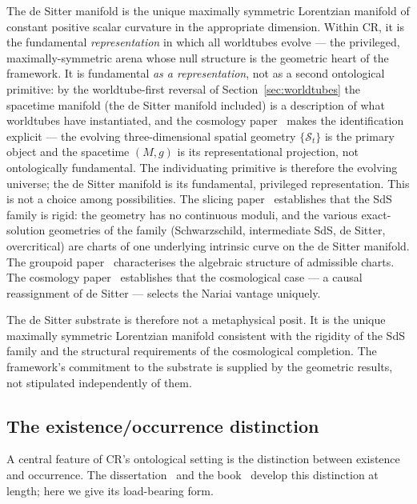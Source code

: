 \documentclass[11pt,a4paper]{article}
\theoremstyle{definition}
\begin{document}
The de Sitter manifold is the unique maximally symmetric Lorentzian manifold of constant positive scalar curvature in the appropriate dimension. Within CR, it is the fundamental \emph{representation} in which all worldtubes evolve --- the privileged, maximally-symmetric arena whose null structure is the geometric heart of the framework. It is fundamental \emph{as a representation}, not as a second ontological primitive: by the worldtube-first reversal of Section~\ref{sec:worldtubes} the spacetime manifold (the de Sitter manifold included) is a description of what worldtubes have instantiated, and the cosmology paper~\cite{JanzenCRcosmology} makes the identification explicit --- the evolving three-dimensional spatial geometry $\{\mathcal{S}_t\}$ is the primary object and the spacetime $(M,g)$ is its representational projection, not ontologically fundamental. The individuating primitive is therefore the evolving universe; the de Sitter manifold is its fundamental, privileged representation. This is not a choice among possibilities. The slicing paper~\cite{JanzenSlicing} establishes that the SdS family is rigid: the geometry has no continuous moduli, and the various exact-solution geometries of the family (Schwarzschild, intermediate SdS, de Sitter, overcritical) are charts of one underlying intrinsic curve on the de Sitter manifold. The groupoid paper~\cite{JanzenGroupoid} characterises the algebraic structure of admissible charts. The cosmology paper~\cite{JanzenCRcosmology} establishes that the cosmological case --- a causal reassignment of de Sitter --- selects the Nariai vantage uniquely.

The de Sitter substrate is therefore not a metaphysical posit. It is the unique maximally symmetric Lorentzian manifold consistent with the rigidity of the SdS family and the structural requirements of the cosmological completion. The framework's commitment to the substrate is supplied by the geometric results, not stipulated independently of them.

\subsection{The existence/occurrence distinction}\label{sec:existence-occurrence}

A central feature of CR's ontological setting is the distinction between existence and occurrence. The dissertation~\cite{Janzen2012} and the book~\cite{Janzen2025} develop this distinction at length; here we give its load-bearing form.
\end{document}
